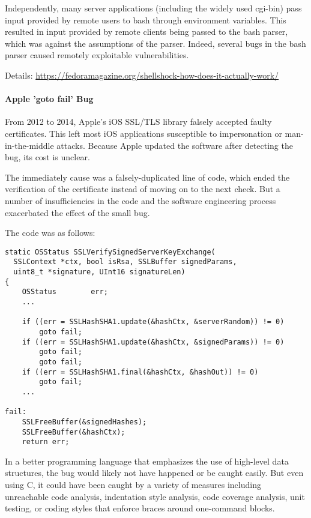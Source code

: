 
Independently, many server applications (including the widely used cgi-bin) pass input provided by remote users to bash through environment variables.
This resulted in input provided by remote clients being passed to the bash parser, which was against the assumptions of the parser.
Indeed, several bugs in the bash parser caused remotely exploitable vulnerabilities.

Details: \url{https://fedoramagazine.org/shellshock-how-does-it-actually-work/}

\paragraph{Apple 'goto fail' Bug}
From 2012 to 2014, Apple's iOS SSL/TLS library falsely accepted faulty certificates.
This left most iOS applications susceptible to impersonation or man-in-the-middle attacks.
Because Apple updated the software after detecting the bug, its cost is unclear.

The immediately cause was a falsely-duplicated line of code, which ended the verification of the certificate instead of moving on to the next check.
But a number of insufficiencies in the code and the software engineering process exacerbated the effect of the small bug.

The code was as follows:

\begin{lstlisting}
static OSStatus SSLVerifySignedServerKeyExchange(
  SSLContext *ctx, bool isRsa, SSLBuffer signedParams,
  uint8_t *signature, UInt16 signatureLen)
{
	OSStatus        err;
	...

	if ((err = SSLHashSHA1.update(&hashCtx, &serverRandom)) != 0)
		goto fail;
	if ((err = SSLHashSHA1.update(&hashCtx, &signedParams)) != 0)
		goto fail;
		goto fail;
	if ((err = SSLHashSHA1.final(&hashCtx, &hashOut)) != 0)
		goto fail;
	...

fail:
	SSLFreeBuffer(&signedHashes);
	SSLFreeBuffer(&hashCtx);
	return err;
\end{lstlisting}

In a better programming language that emphasizes the use of high-level data structures, the bug would likely not have happened or be caught easily.
But even using C, it could have been caught by a variety of measures including unreachable code analysis, indentation style analysis, code coverage analysis, unit testing, or coding styles that enforce braces around one-command blocks.
 
